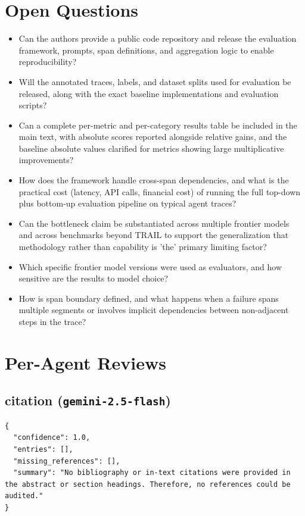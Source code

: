 \documentclass[11pt]{article}
\begin{document}
\section*{Open Questions}
\begin{itemize}[leftmargin=*]
  \item Can the authors provide a public code repository and release the evaluation framework, prompts, span definitions, and aggregation logic to enable reproducibility?
  \item Will the annotated traces, labels, and dataset splits used for evaluation be released, along with the exact baseline implementations and evaluation scripts?
  \item Can a complete per-metric and per-category results table be included in the main text, with absolute scores reported alongside relative gains, and the baseline absolute values clarified for metrics showing large multiplicative improvements?
  \item How does the framework handle cross-span dependencies, and what is the practical cost (latency, API calls, financial cost) of running the full top-down plus bottom-up evaluation pipeline on typical agent traces?
  \item Can the bottleneck claim be substantiated across multiple frontier models and across benchmarks beyond TRAIL to support the generalization that methodology rather than capability is 'the' primary limiting factor?
  \item Which specific frontier model versions were used as evaluators, and how sensitive are the results to model choice?
  \item How is span boundary defined, and what happens when a failure spans multiple segments or involves implicit dependencies between non-adjacent steps in the trace?
\end{itemize}

\section*{Per-Agent Reviews}
\subsection*{citation (\texttt{gemini-2.5-flash})}
\begin{verbatim}
{
  "confidence": 1.0,
  "entries": [],
  "missing_references": [],
  "summary": "No bibliography or in-text citations were provided in the abstract or section headings. Therefore, no references could be audited."
}
\end{verbatim}
\end{document}
